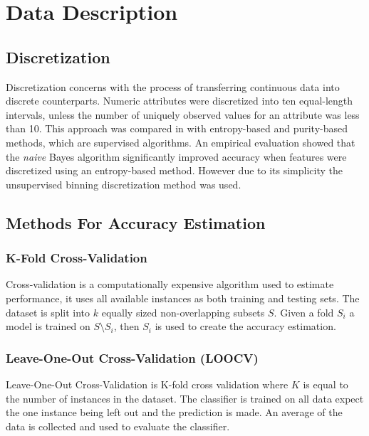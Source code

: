 \documentclass{cmppgr}
\begin{document}
 


\section{Data Description}

\subsection{Discretization}
Discretization concerns with the process of transferring continuous data into discrete counterparts. Numeric attributes were discretized into ten equal-length intervals, unless the number of uniquely observed values for an attribute was less than 10. This approach was compared in \cite{dougherty1995supervised} with entropy-based and purity-based methods, which are supervised algorithms. An empirical evaluation showed that the \textit{naive} Bayes algorithm significantly improved accuracy when features were discretized using an entropy-based method. However due to its simplicity the unsupervised binning discretization method was used.

\subsection{Methods For Accuracy Estimation}







\subsubsection{K-Fold Cross-Validation}
Cross-validation is a computationally expensive algorithm used to estimate performance, it uses all available instances as both training and testing sets. The dataset is split into $k$ equally sized non-overlapping subsets $S$. Given a fold $S_i$ a model is trained on $S \setminus S_i$, then $S_i$ is used to create the accuracy estimation.

\subsubsection{Leave-One-Out Cross-Validation (LOOCV)}
Leave-One-Out Cross-Validation is  K-fold cross validation where $K$ is equal to the number of instances in the dataset. The classifier is trained on all data expect the one instance being left out and the prediction is made. An average of the data is collected and used to evaluate the classifier. 
\end{document}
